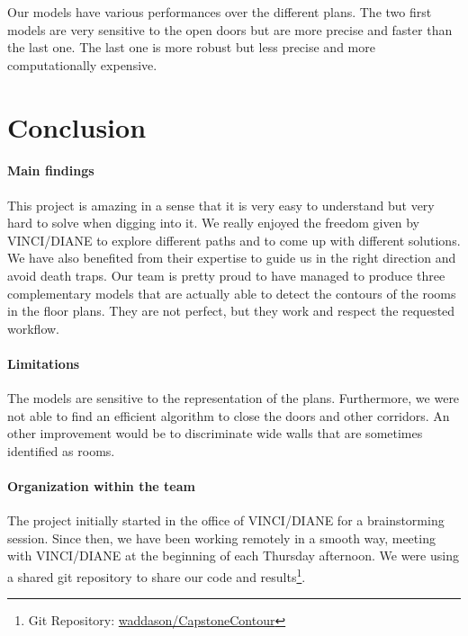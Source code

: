 \documentclass[11pt]{article}
\begin{document}
Our models have various performances over the different plans. The two
first models are very sensitive to the open doors but are more precise and 
faster than the last one. The last one is more robust but less precise and
more computationally expensive.

\section{Conclusion}
\paragraph{Main findings}
This project is amazing in a sense that it is very easy to understand but very hard
to solve when digging into it. We really enjoyed the freedom given by VINCI/DIANE
to explore different paths and to come up with different solutions. We have
also benefited from their expertise to guide us in the right direction and avoid
death traps. 
Our team is pretty proud to have managed to produce three complementary models that are actually able to
detect the contours of the rooms in the floor plans. They are not perfect, but
they work and respect the requested workflow.

\paragraph{Limitations}
The models are sensitive to the representation of the plans. Furthermore, we 
were not able to find an efficient algorithm to close the doors and other corridors.
An other improvement would be to discriminate wide walls that are sometimes 
identified as rooms.

\paragraph{Organization within the team}
The project initially started in the office of VINCI/DIANE for a brainstorming session.
Since then, we have been working remotely in a smooth way, meeting with 
VINCI/DIANE at the beginning of each Thursday afternoon. We were using a shared 
git repository to share our code and results\footnote{Git Repository: \href{https://github.com/waddason/CapstoneContour}{waddason/CapstoneContour}}.
\end{document}
